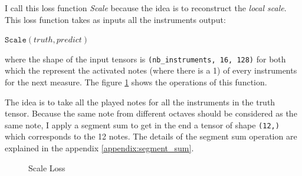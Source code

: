 \documentclass[12pt]{report}
\begin{document}
I call this loss function \textit{Scale} because the idea is to reconstruct the \textit{local scale}.
This loss function takes as inputs all the instruments output:
\begin{center}
$\texttt{Scale}(truth, predict)$
\end{center}
where the shape of the input tensors is \texttt{(nb\_instruments, 16, 128)} for both which the represent the activated notes (where there is a 1) of every instruments for the next measure. The figure \ref{fig:loss_scale} shows the operations of this function.

The idea is to take all the played notes for all the instruments in the truth tensor.
Because the same note from different octaves should be considered as the same note, I apply a segment sum to get in the end a tensor of shape \texttt{(12,)} which corresponds to the 12 notes.
The details of the segment sum operation are explained in the appendix \ref{appendix:segment_sum}.


\begin{figure}[h]
\begin{center}
\end{center}
\caption{Scale Loss}
\label{fig:loss_scale}
\end{figure}
\end{document}
